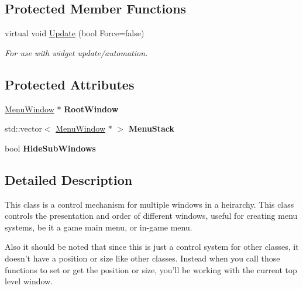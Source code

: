 \subsection*{Protected Member Functions}
\begin{DoxyCompactItemize}
\item 
\hypertarget{classphys_1_1UI_1_1Menu_a8759b8656fdbbc0e1231a3f8d2ad4835}{
virtual void \hyperlink{classphys_1_1UI_1_1Menu_a8759b8656fdbbc0e1231a3f8d2ad4835}{Update} (bool Force=false)}
\label{d6/dd3/classphys_1_1UI_1_1Menu_a8759b8656fdbbc0e1231a3f8d2ad4835}

\begin{DoxyCompactList}\small\item\em For use with widget update/automation. \item\end{DoxyCompactList}\end{DoxyCompactItemize}
\subsection*{Protected Attributes}
\begin{DoxyCompactItemize}
\item 
\hypertarget{classphys_1_1UI_1_1Menu_a03f7faf891c709b0a6123d4399018f30}{
\hyperlink{classphys_1_1UI_1_1MenuWindow}{MenuWindow} $\ast$ {\bfseries RootWindow}}
\label{d6/dd3/classphys_1_1UI_1_1Menu_a03f7faf891c709b0a6123d4399018f30}

\item 
\hypertarget{classphys_1_1UI_1_1Menu_a76096b5896d94bee6acb7cd0e03258db}{
std::vector$<$ \hyperlink{classphys_1_1UI_1_1MenuWindow}{MenuWindow} $\ast$ $>$ {\bfseries MenuStack}}
\label{d6/dd3/classphys_1_1UI_1_1Menu_a76096b5896d94bee6acb7cd0e03258db}

\item 
\hypertarget{classphys_1_1UI_1_1Menu_a695069775a855feb9eddab9f23c2e465}{
bool {\bfseries HideSubWindows}}
\label{d6/dd3/classphys_1_1UI_1_1Menu_a695069775a855feb9eddab9f23c2e465}

\end{DoxyCompactItemize}


\subsection{Detailed Description}
This class is a control mechanism for multiple windows in a heirarchy. This class controls the presentation and order of different windows, useful for creating menu systems, be it a game main menu, or in-\/game menu. \par
 \par
 Also it should be noted that since this is just a control system for other classes, it doesn't have a position or size like other classes. Instead when you call those functions to set or get the position or size, you'll be working with the current top level window. 

